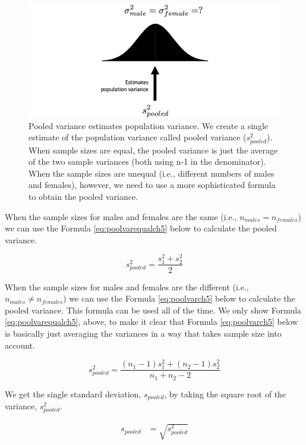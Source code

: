 \documentclass[
]{krantz}
\begin{document}
\newpage

\begin{figure}
\includegraphics[width=0.8\linewidth]{ch_samples/images/pool3} \caption[Pooled variance estimates population variance]{Pooled variance estimates population variance. We create a single estimate of the population variance called pooled variance ($s_{pooled}^2$). When sample sizes are equal, the pooled variance is just the average of the two sample variances (both using n-1 in the denominator). When the sample sizes are unequal (i.e., different numbers of males and females), however, we need to use a more sophisticated formula to obtain the pooled variance.}\label{fig:pool3}
\end{figure}

When the sample sizes for males and females are the same (i.e., \(n_{males} =n_{females}\)) we can use the Formula \eqref{eq:poolvarequalch5} below to calculate the pooled variance.

\begin{equation} 
s_{pooled}^2  = \frac{s_{1}^2 + s_{2}^2}{2} 
      \label{eq:poolvarequalch5}
\end{equation}

When the sample sizes for males and females are the different (i.e., \(n_{males} \ne n_{females}\)) we can use the Formula \eqref{eq:poolvarch5} below to calculate the pooled variance. This formula can be used all of the time. We only show Formula \eqref{eq:poolvarequalch5}, above, to make it clear that Formula \eqref{eq:poolvarch5} below is basically just averaging the variances in a way that takes sample size into account.

\begin{equation} 
s_{pooled}^2  = \frac{(n_1 -1)s_1^2 + (n_2 -1)s_2^2}{n_1 + n_2-2}
      \label{eq:poolvarch5}
\end{equation}

We get the single standard deviation, \(s_{pooled}\), by taking the square root of the variance, \(s_{pooled}^2\).

\[
\begin{aligned} 
s_{pooled}  &= \sqrt{s_{pooled}^2} \\
\end{aligned} 
\]
\end{document}
